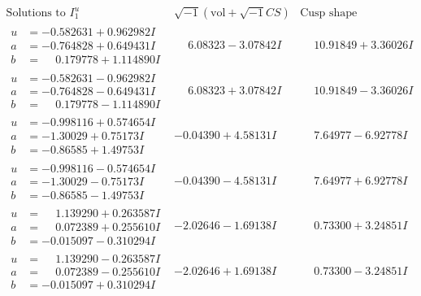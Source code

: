 \documentclass[1p]{elsarticle_modified}
\theoremstyle{definition}
\newcommand{\I}{\sqrt{-1}}
\begin{document}
$$\begin{array}{c|c|c}  
\text{Solutions to }I^u_{1}& \I (\text{vol} + \sqrt{-1}CS) & \text{Cusp shape}\\
 \hline 
\begin{aligned}
u &= -0.582631 + 0.962982 I \\
a &= -0.764828 + 0.649431 I \\
b &= \phantom{-}0.179778 + 1.114890 I\end{aligned}
 & \phantom{-}6.08323 - 3.07842 I & \phantom{-}10.91849 + 3.36026 I \\ \hline\begin{aligned}
u &= -0.582631 - 0.962982 I \\
a &= -0.764828 - 0.649431 I \\
b &= \phantom{-}0.179778 - 1.114890 I\end{aligned}
 & \phantom{-}6.08323 + 3.07842 I & \phantom{-}10.91849 - 3.36026 I \\ \hline\begin{aligned}
u &= -0.998116 + 0.574654 I \\
a &= -1.30029 + 0.75173 I \\
b &= -0.86585 + 1.49753 I\end{aligned}
 & -0.04390 + 4.58131 I & \phantom{-}7.64977 - 6.92778 I \\ \hline\begin{aligned}
u &= -0.998116 - 0.574654 I \\
a &= -1.30029 - 0.75173 I \\
b &= -0.86585 - 1.49753 I\end{aligned}
 & -0.04390 - 4.58131 I & \phantom{-}7.64977 + 6.92778 I \\ \hline\begin{aligned}
u &= \phantom{-}1.139290 + 0.263587 I \\
a &= \phantom{-}0.072389 + 0.255610 I \\
b &= -0.015097 - 0.310294 I\end{aligned}
 & -2.02646 - 1.69138 I & \phantom{-}0.73300 + 3.24851 I \\ \hline\begin{aligned}
u &= \phantom{-}1.139290 - 0.263587 I \\
a &= \phantom{-}0.072389 - 0.255610 I \\
b &= -0.015097 + 0.310294 I\end{aligned}
 & -2.02646 + 1.69138 I & \phantom{-}0.73300 - 3.24851 I \\ \hline\begin{aligned}

\end{aligned}
\end{array}$$
\end{document}
